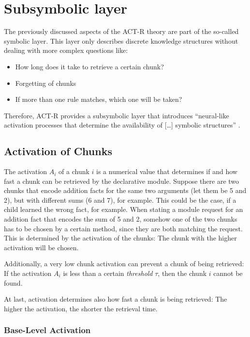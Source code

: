 \section{Subsymbolic layer}
\label{subsymbolic_layer}

The previously discussed aspects of the ACT-R theory are part of the so-called symbolic layer. This layer only describes discrete knowledge structures without dealing with more complex questions like: 

\begin{itemize}
\item How long does it take to retrieve a certain chunk? 
\item Forgetting of chunks
\item If more than one rule matches, which one will be taken?
\end{itemize}

Therefore, ACT-R provides a subsymbolic layer that introduces ``neural-like activation processes that determine the availability of [\dots] symbolic structures'' \cite{anderson_implications_2000}.

\subsection{Activation of Chunks}
\label{activation}

The activation $A_i$ of a chunk $i$ is a numerical value that determines if and how fast a chunk can be retrieved by the declarative module. Suppose there are two chunks that encode addition facts for the same two arguments (let them be 5 and 2), but with different sums (6 and 7), for example. This could be the case, if a child learned the wrong fact, for example. When stating a module request for an addition fact that encodes the sum of 5 and 2, somehow one of the two chunks has to be chosen by a certain method, since they are both matching the request. This is determined by the activation of the chunks: The chunk with the higher activation will be chosen.

Additionally, a very low chunk activation can prevent a chunk of being retrieved: If the activation $A_i$ is less than a certain \emph{threshold} $\tau$, then the chunk $i$ cannot be found.

At last, activation determines also how fast a chunk is being retrieved: The higher the activation, the shorter the retrieval time.

\subsubsection{Base-Level Activation}
\label{base_level_activation}

